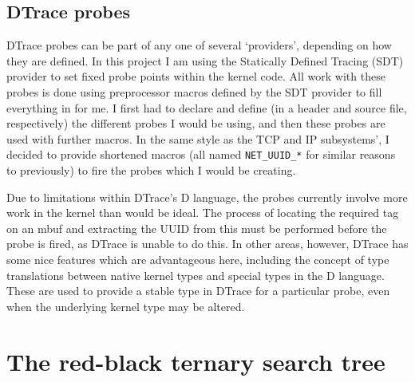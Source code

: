 \documentclass[a4paper,12pt,twoside,openright]{report}
\begin{document}
	\subsection{DTrace probes}
	
	DTrace probes can be part of any one of several `providers', depending on how they are defined. In this project I am using the Statically Defined Tracing (SDT) provider to set fixed probe points within the kernel code. All work with these probes is done using preprocessor macros defined by the SDT provider to fill everything in for me. I first had to declare and define (in a header and source file, respectively) the different probes I would be using, and then these probes are used with further macros. In the same style as the TCP and IP subsystems', I decided to provide shortened macros (all named \verb|NET_UUID_*| for similar reasons to previously) to fire the probes which I would be creating.
	
	Due to limitations within DTrace's D language, the probes currently involve more work in the kernel than would be ideal. The process of locating the required tag on an mbuf and extracting the UUID from this must be performed before the probe is fired, as DTrace is unable to do this. In other areas, however, DTrace has some nice features which are advantageous here, including the concept of type translations between native kernel types and special types in the D language. These are used to provide a stable type in DTrace for a particular probe, even when the underlying kernel type may be altered.
	
	\section{The red-black ternary search tree}
	\label{sec:TST-impl}
	
\end{document}
